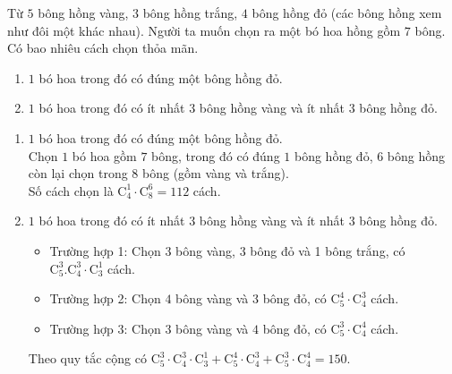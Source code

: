 \begin{vd}
	Từ $5$ bông hồng vàng, $3$ bông hồng trắng, $4$ bông hồng đỏ (các bông hồng xem như đôi một khác nhau). Người ta muốn chọn ra một bó hoa hồng gồm $7$ bông. Có bao nhiêu cách chọn thỏa mãn.
	\begin{enumerate}
		\item $1$ bó hoa trong đó có đúng một bông hồng đỏ.
		\item $1$ bó hoa trong đó có ít nhất $3$ bông hồng vàng và ít nhất $3$ bông hồng đỏ.
	\end{enumerate}
	\loigiai
	{
		\begin{enumerate}
			\item $1$ bó hoa trong đó có đúng một bông hồng đỏ.\\
			Chọn $1$ bó hoa gồm $7$ bông, trong đó có đúng $1$ bông hồng đỏ, $6$ bông hồng còn lại chọn trong $8$ bông (gồm vàng và trắng). \\
			Số cách chọn là $\mathrm{C}_4^1\cdot \mathrm{C}_8^6=112$ cách.
			\item $1$ bó hoa trong đó có ít nhất $3$ bông hồng vàng và ít nhất $3$ bông hồng đỏ.
			\begin{itemize}
				\item Trường hợp 1: Chọn $3$ bông vàng, $3$ bông đỏ và 1 bông trắng, có $\mathrm{C}_5^3.\mathrm{C}_4^3\cdot\mathrm{C}_3^{1}$ cách.
				\item Trường hợp 2: Chọn $4$ bông vàng và $3$ bông đỏ, có $\mathrm{C}_5^4\cdot\mathrm{C}_4^3$ cách.
				\item Trường hợp 3: Chọn $3$ bông vàng và $4$ bông đỏ, có $\mathrm{C}_5^3\cdot\mathrm{C}_4^4$ cách.
			\end{itemize}
			Theo quy tắc cộng có $\mathrm{C}_5^3\cdot \mathrm{C}_4^3\cdot \mathrm{C}_3^{1}+\mathrm{C}_5^4\cdot \mathrm{C}_4^3+\mathrm{C}_5^3\cdot\mathrm{C}_4^4=150$.
		\end{enumerate}
	}
\end{vd}

